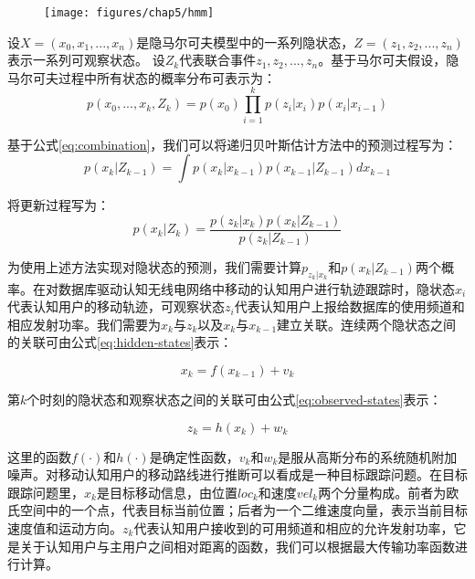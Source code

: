\begin{figure}[!htp]\label{fig:hmm}
  \centering
  \texttt{[image: figures/chap5/hmm]}
\end{figure}

设$X=(x_{0},x_{1},...,x_{n})$是隐马尔可夫模型中的一系列隐状态，$Z=(z_{1},z_{2},...,z_{n})$表示一系列可观察状态。
设$Z_{k}$代表联合事件$z_{1},z_{2},...,z_{n}$。基于马尔可夫假设，隐马尔可夫过程中所有状态的概率分布可表示为：
\begin{equation}\label{eq:combination}
p(x_{0},...,x_{k},Z_{k})=p(x_{0})\prod_{i=1}^k{p(z_{i}|x_{i})p(x_{i}|x_{i-1})}
\end{equation}

基于公式\ref{eq:combination}，我们可以将递归贝叶斯估计方法中的预测过程写为：
\begin{equation}\label{eq:predict}
p(x_{k}|Z_{k-1})=\int p(x_{k}|x_{k-1})p(x_{k-1}|Z_{k-1})dx_{k-1}
\end{equation}

将更新过程写为：
\begin{equation}\label{eq:update}
p(x_{k}|Z_{k})=\frac{p(z_{k}|x_{k})p(x_{k}|Z_{k-1})}{p(z_{k}|Z_{k-1})}
\end{equation}

为使用上述方法实现对隐状态的预测，我们需要计算$p_{z_{k}|x_{k}}$和$p(x_{k}|Z_{k-1})$两个概率。在对数据库驱动认知无线电网络中移动的认知用户进行轨迹跟踪时，隐状态$x_{i}$代表认知用户的移动轨迹，可观察状态$z_{i}$代表认知用户上报给数据库的使用频道和相应发射功率。我们需要为$x_{k}$与$z_{k}$以及$x_{k}$与$x_{k-1}$建立关联。连续两个隐状态之间的关联可由公式\ref{eq:hidden-states}表示：

\begin{equation}\label{eq:hidden-states}
x_{k}=f(x_{k-1})+v_{k}
\end{equation}

第$k$个时刻的隐状态和观察状态之间的关联可由公式\ref{eq:observed-states}表示：

\begin{equation}\label{eq:observed-states}
z_{k}=h(x_{k})+w_{k}
\end{equation}

这里的函数$f(\cdot)$和$h(\cdot)$是确定性函数，$v_{k}$和$w_{k}$是服从高斯分布的系统随机附加噪声。对移动认知用户的移动路线进行推断可以看成是一种目标跟踪问题。在目标跟踪问题里，$x_{k}$是目标移动信息，由位置$loc_{k}$和速度$vel_{k}$两个分量构成。前者为欧氏空间中的一个点，代表目标当前位置；后者为一个二维速度向量，表示当前目标速度值和运动方向。$z_{k}$代表认知用户接收到的可用频道和相应的允许发射功率，它是关于认知用户与主用户之间相对距离的函数，我们可以根据最大传输功率函数进行计算。

